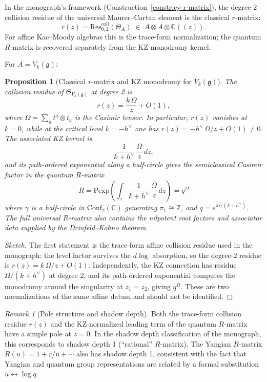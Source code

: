 \documentclass[11pt]{article}
\newtheorem{proposition}[theorem]{Proposition}
\theoremstyle{definition}
\theoremstyle{remark}
\newtheorem{remark}[theorem]{Remark}
\newcommand{\frakg}{\mathfrak{g}}
\newcommand{\hv}{h^\vee}
\begin{document}
In the monograph's framework (Construction~\ref{constr:cy-r-matrix}),
the degree-$2$ collision residue of the universal Maurer--Cartan
element is the classical $r$-matrix:
\[
 r(z) = \mathrm{Res}^{\mathrm{coll}}_{0,2}(\Theta_A)
 \;\in\; A \otimes A \otimes \mathbb{C}((z)).
\]
For affine Kac--Moody algebras this is the trace-form normalization;
the quantum $R$-matrix is recovered separately from the KZ monodromy
kernel.

For $A = V_k(\frakg)$:

\begin{proposition}[Classical $r$-matrix and KZ monodromy for $V_k(\frakg)$]
\label{prop:r-matrix-vk}
The collision residue of $\Theta_{V_k(\frakg)}$ at degree 2 is
\[
 r(z) = \frac{k\,\Omega}{z} + O(1),
\]
where $\Omega = \sum_a t^a \otimes t_a$ is the Casimir tensor. In
particular, $r(z)$ vanishes at $k=0$, while at the critical level
$k = -\hv$ one has $r(z) = -\hv\,\Omega/z + O(1) \neq 0$. The
associated KZ kernel is
\[
 \frac{1}{k + \hv}\,\frac{\Omega}{z}\,dz,
\]
	and its path-ordered exponential along a half-circle gives the
	semiclassical Casimir factor in the quantum $R$-matrix
\[
 R = \mathrm{Pexp}\!\left(
 \int_\gamma \frac{1}{k + \hv}\,\frac{\Omega}{z}\, dz
 \right)
 = q^{\Omega}
\]
where $\gamma$ is a half-circle in $\mathrm{Conf}_2(\mathbb{C})$
generating $\pi_1 \cong \mathbb{Z}$, and $q = e^{\pi i/(k+\hv)}$.
The full universal $R$-matrix also contains the nilpotent root factors
and associator data supplied by the Drinfeld--Kohno theorem.
\end{proposition}

\begin{proof}[Sketch]
The first statement is the trace-form affine collision residue used in
the monograph: the level factor survives the $d\log$ absorption, so the
degree-$2$ residue is $r(z) = k\,\Omega/z + O(1)$. Independently, the
KZ connection has residue $\Omega/(k+\hv)$ at degree 2, and its
path-ordered exponential computes the monodromy around the singularity
at $z_1 = z_2$, giving $q^{\Omega}$. These are two normalizations of the
same affine datum and should not be identified.
\end{proof}

\begin{remark}[Pole structure and shadow depth]
Both the trace-form collision residue $r(z)$ and the KZ-normalized
leading term of the quantum $R$-matrix have a simple pole at $z = 0$.
In the shadow depth classification of the monograph, this corresponds
to shadow depth 1 (``rational'' $R$-matrix). The Yangian $R$-matrix
$R(u) = 1 + r/u + \cdots$ also has shadow depth 1, consistent with
the fact that Yangian and quantum group representations are related
by a formal substitution $u \leftrightarrow \log q$.
\end{remark}
\end{document}
